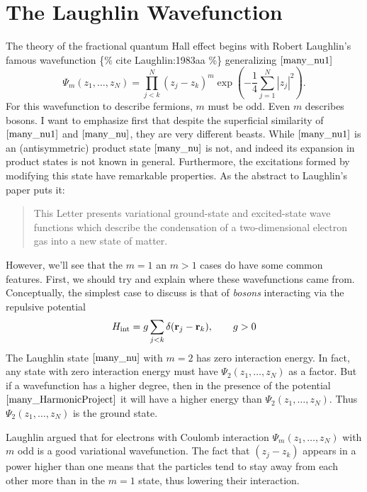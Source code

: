 \documentclass[
  letterpaper,
  DIV=11,
  numbers=noendperiod]{scrreprt}
\begin{document}
\section{The Laughlin Wavefunction}\label{the-laughlin-wavefunction}

The theory of the fractional quantum Hall effect begins with Robert
Laughlin's famous wavefunction \{\% cite Laughlin:1983aa \%\}
generalizing \(\eqref{many_nu1}\) \[
\Psi_m(z_1,\ldots, z_N) = \prod_{j<k}^N (z_j-z_k)^{m} \exp\left(-\frac{1}{4}\sum_{j=1}^N\left|z_j\right|^2\right).
\label{many_nu}
\] For this wavefunction to describe fermions, \(m\) must be odd. Even
\(m\) describes bosons. I want to emphasize first that despite the
superficial similarity of \(\eqref{many_nu1}\) and \(\eqref{many_nu}\),
they are very different beasts. While \(\eqref{many_nu1}\) is an
(antisymmetric) product state \(\eqref{many_nu}\) is not, and indeed its
expansion in product states is not known in general. Furthermore, the
excitations formed by modifying this state have remarkable properties.
As the abstract to Laughlin's paper puts it:

\begin{quote}
This Letter presents variational ground-state and excited-state wave
functions which describe the condensation of a two-dimensional electron
gas into a new state of matter.
\end{quote}

However, we'll see that the \(m=1\) an \(m>1\) cases do have some common
features. First, we should try and explain where these wavefunctions
came from. Conceptually, the simplest case to discuss is that of
\emph{bosons} interacting via the repulsive potential \[
H_{\text{int}} = g\sum_{j<k}\delta(\mathbf{r}_j-\mathbf{r}_k),\qquad g>0
\label{many_delta}
\] The Laughlin state \(\eqref{many_nu}\) with \(m=2\) has zero
interaction energy. In fact, any state with zero interaction energy must
have \(\Psi_2(z_1,\ldots, z_N)\) as a factor. But if a wavefunction has
a higher degree, then in the presence of the potential
\(\eqref{many_HarmonicProject}\) it will have a higher energy than
\(\Psi_2(z_1,\ldots, z_N)\). Thus \(\Psi_2(z_1,\ldots, z_N)\) is the
ground state.

Laughlin argued that for electrons with Coulomb interaction
\(\Psi_{m}(z_1,\ldots, z_N)\) with \(m\) odd is a good variational
wavefunction. The fact that \((z_j-z_k)\) appears in a power higher than
one means that the particles tend to stay away from each other more than
in the \(m=1\) state, thus lowering their interaction.
\end{document}
